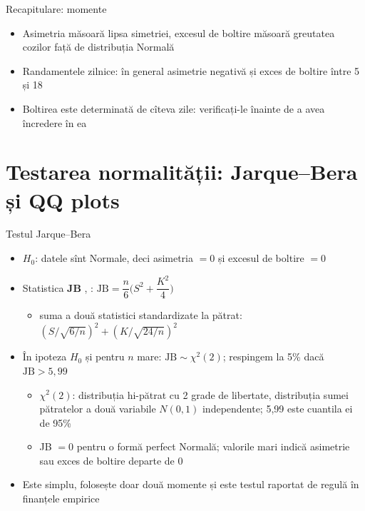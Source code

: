 \begin{frame}{Recapitulare: momente}
\itemsize{\small}
\begin{itemize}
    \item Asimetria măsoară lipsa simetriei, excesul de boltire măsoară greutatea cozilor față de distribuția Normală
    \item Randamentele zilnice: în general asimetrie negativă și exces de boltire între 5 și 18
    \item Boltirea este determinată de cîteva zile: verificați-le înainte de a avea încredere în ea
\end{itemize}
\end{frame}


\section{Testarea normalității: Jarque--Bera și QQ plots}

\begin{frame}{Testul Jarque--Bera}
\itemsize{\small}
\begin{itemize}
    \item $H_0$: datele sînt Normale, deci asimetria $= 0$ și excesul de boltire $= 0$
    \item Statistica \textbf{JB} , : $\text{JB} = \dfrac{n}{6}\Big(S^2 + \dfrac{K^2}{4}\Big)$
    \begin{itemize}
        \item suma a două statistici standardizate la pătrat: $(S/\sqrt{6/n})^2 + (K/\sqrt{24/n})^2$
    \end{itemize}
    \item În ipoteza $H_0$ și pentru $n$ mare: $\text{JB} \sim \chi^2(2)$; respingem la 5\% dacă $\text{JB} > 5{,}99$
    \begin{itemize}
        \item $\chi^2(2)$: distribuția hi-pătrat cu 2 grade de libertate, distribuția sumei pătratelor a două variabile $N(0,1)$ independente; 5{,}99 este cuantila ei de 95\%
        \item JB $= 0$ pentru o formă perfect Normală; valorile mari indică asimetrie sau exces de boltire departe de 0
    \end{itemize}
    \item Este simplu, folosește doar două momente și este testul raportat de regulă în finanțele empirice
\end{itemize}
\end{frame}

